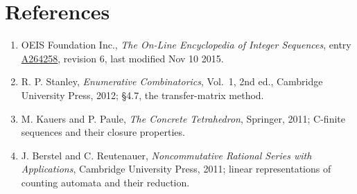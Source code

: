 \documentclass[11pt]{article}
\theoremstyle{definition}
\begin{document}
\section{References}

\begin{enumerate}

\item OEIS Foundation Inc., \emph{The On-Line Encyclopedia of Integer Sequences}, entry \href{https://oeis.org/A264258}{A264258}, revision 6, last modified Nov 10 2015.

\item R. P. Stanley, \emph{Enumerative Combinatorics}, Vol.~1, 2nd ed., Cambridge University Press, 2012; \S4.7, the transfer-matrix method.

\item M. Kauers and P. Paule, \emph{The Concrete Tetrahedron}, Springer, 2011; C-finite sequences and their closure properties.

\item J. Berstel and C. Reutenauer, \emph{Noncommutative Rational Series with Applications}, Cambridge University Press, 2011; linear representations of counting automata and their reduction.

\end{enumerate}
\end{document}
